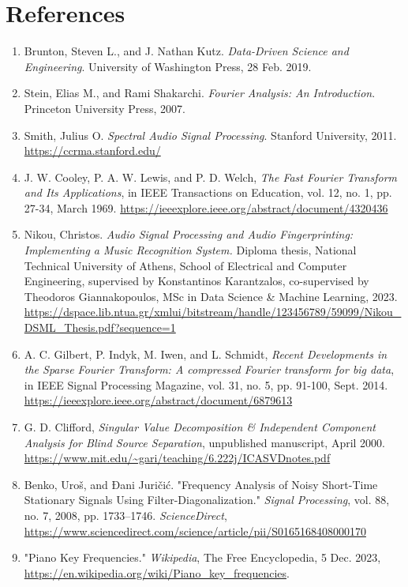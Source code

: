 \documentclass{article}
\begin{document}
\section*{References}
\begin{enumerate}
    \item Brunton, Steven L., and J. Nathan Kutz. \textit{Data-Driven Science and Engineering}. University of Washington Press, 28 Feb. 2019.

    \item Stein, Elias M., and Rami Shakarchi. \textit{Fourier Analysis: An Introduction}. Princeton University Press, 2007.

    \item Smith, Julius O. \textit{Spectral Audio Signal Processing}. Stanford University, 2011. 
    \url{https://ccrma.stanford.edu/}

    \item J. W. Cooley, P. A. W. Lewis, and P. D. Welch, \textit{The Fast Fourier Transform and Its Applications}, in IEEE Transactions on Education, vol. 12, no. 1, pp. 27-34, March 1969. 
    \url{https://ieeexplore.ieee.org/abstract/document/4320436}

    \item Nikou, Christos. \textit{Audio Signal Processing and Audio Fingerprinting: Implementing a Music Recognition System.} Diploma thesis, National Technical University of Athens, School of Electrical and Computer Engineering, supervised by Konstantinos Karantzalos, co-supervised by Theodoros Giannakopoulos, MSc in Data Science \& Machine Learning, 2023. 
    \url{https://dspace.lib.ntua.gr/xmlui/bitstream/handle/123456789/59099/Nikou_DSML_Thesis.pdf?sequence=1}

    \item A. C. Gilbert, P. Indyk, M. Iwen, and L. Schmidt, \textit{Recent Developments in the Sparse Fourier Transform: A compressed Fourier transform for big data}, in IEEE Signal Processing Magazine, vol. 31, no. 5, pp. 91-100, Sept. 2014. 
    \url{https://ieeexplore.ieee.org/abstract/document/6879613}

    \item G. D. Clifford, \textit{Singular Value Decomposition \& Independent Component Analysis for Blind Source Separation}, unpublished manuscript, April 2000. 
    \url{https://www.mit.edu/~gari/teaching/6.222j/ICASVDnotes.pdf}

    \item Benko, Uroš, and Đani Juričić. "Frequency Analysis of Noisy Short-Time Stationary Signals Using Filter-Diagonalization." \textit{Signal Processing}, vol. 88, no. 7, 2008, pp. 1733--1746. \textit{ScienceDirect}, 
        \url{https://www.sciencedirect.com/science/article/pii/S0165168408000170}

    \item "Piano Key Frequencies." \textit{Wikipedia}, The Free Encyclopedia, 5 Dec. 2023, 
    \url{https://en.wikipedia.org/wiki/Piano_key_frequencies}.

\end{enumerate}
\end{document}
